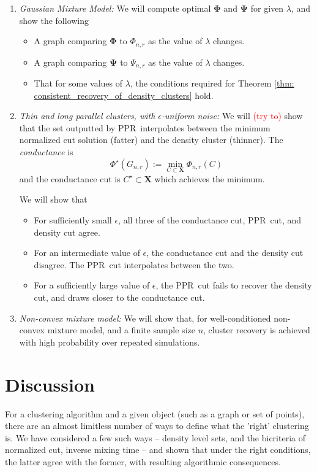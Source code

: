 \documentclass{article}
\newcommand{\1}{\mathbf{1}}
\newcommand{\Phibf}{\mathbf{\Phi}}
\newcommand{\Psibf}{\mathbf{\Psi}}
\newcommand{\Xbf}{\mathbf{X}}
\newcommand{\pprspace}{{\sc PPR~}}
\theoremstyle{aldenthm}
\theoremstyle{remark}
\begin{document}
\begin{enumerate}
	\item 
	\textit{Gaussian Mixture Model:} 
	We will compute optimal $\Phibf$ and $\Psibf$ for given $\lambda$, and show the following
	\begin{itemize}
		\item A graph comparing $\Phibf$ to $\Phi_{n,r}$ as the value of $\lambda$ changes.
		\item A graph comparing $\Psibf$ to $\Psi_{n,r}$ as the value of $\lambda$ changes.
		\item That for some values of $\lambda$, the conditions required for Theorem \ref{thm: consistent_recovery_of_density_clusters} hold.
	\end{itemize}

	\item
	\textit{Thin and long parallel clusters, with $\epsilon$-uniform noise: }
	We will \textcolor{red}{(try to)} show that the set outputted by \pprspace interpolates between the minimum normalized cut solution (fatter) and the density cluster (thinner). The \emph{conductance} is
	\begin{equation*}
	\Phi^{\star}(G_{n,r}) := \min_{C \subset \Xbf} \Phi_{n,r}(C)
	\end{equation*}
	and the conductance cut is $C^{\star} \subset \Xbf$ which achieves the minimum.
	
	We will show that
	\begin{itemize}
		\item For sufficiently small $\epsilon$, all three of the conductance cut, \pprspace cut, and density cut agree.
		\item For an intermediate value of $\epsilon$, the conductance cut and the density cut disagree. The \pprspace cut interpolates between the two.
		\item For a sufficiently large value of $\epsilon$, the \pprspace cut fails to recover the density cut, and draws closer to the conductance cut.
	\end{itemize}

	\item 
	\textit{Non-convex mixture model:} We will show that, for well-conditioned non-convex mixture model, and a finite sample size $n$, cluster recovery is achieved with high probability over repeated simulations.
\end{enumerate}

\section{Discussion}
For a clustering algorithm and a given object (such as a graph or set of points), there are an almost limitless number of ways to define what the 'right' clustering is. We have considered a few such ways -- density level sets, and the bicriteria of normalized cut, inverse mixing time -- and shown that under the right conditions, the latter agree with the former, with resulting algorithmic consequences.
\end{document}
